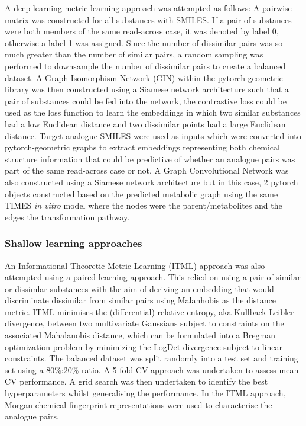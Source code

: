 \documentclass[
  super,
  preprint,
  3p]{elsarticle}
\begin{document}
A deep learning metric learning approach was attempted as follows: A
pairwise matrix was constructed for all substances with SMILES. If a
pair of substances were both members of the same read-across case, it
was denoted by label 0, otherwise a label 1 was assigned. Since the
number of dissimilar pairs was so much greater than the number of
similar pairs, a random sampling was performed to downsample the number
of dissimilar pairs to create a balanced dataset. A Graph Isomorphism
Network (GIN) within the pytorch geometric library was then constructed
using a Siamese network architecture such that a pair of substances
could be fed into the network, the contrastive loss could be used as the
loss function to learn the embeddings in which two similar substances
had a low Euclidean distance and two dissimilar points had a large
Euclidean distance. Target-analogue SMILES were used as inputs which
were converted into pytorch-geometric graphs to extract embeddings
representing both chemical structure information that could be
predictive of whether an analogue pairs was part of the same read-across
case or not. A Graph Convolutional Network was also constructed using a
Siamese network architecture but in this case, 2 pytorch objects
constructed based on the predicted metabolic graph using the same TIMES
\emph{in vitro} model where the nodes were the parent/metabolites and
the edges the transformation pathway.

\subsubsection{Shallow learning
approaches}\label{shallow-learning-approaches}

An Informational Theoretic Metric Learning (ITML) approach was also
attempted using a paired learning approach. This relied on using a pair
of similar or dissimlar substances with the aim of deriving an embedding
that would discriminate dissimilar from similar pairs using Malanhobis
as the distance metric. ITML minimises the (differential) relative
entropy, aka Kullback-Leibler divergence, between two multivariate
Gaussians subject to constraints on the associated Mahalanobis distance,
which can be formulated into a Bregman optimization problem by
minimizing the LogDet divergence subject to linear constraints. The
balanced dataset was split randomly into a test set and training set
using a 80\%:20\% ratio. A 5-fold CV approach was undertaken to assess
mean CV performance. A grid search was then undertaken to identify the
best hyperparameters whilst generalising the performance. In the ITML
approach, Morgan chemical fingerprint representations were used to
characterise the analogue pairs.
\end{document}
